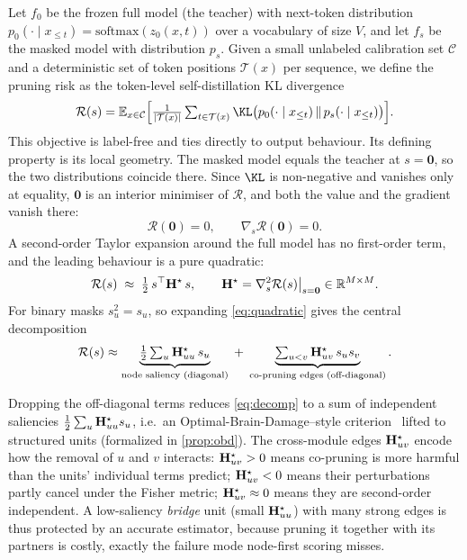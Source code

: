 Let $f_0$ be the frozen full model (the teacher) with next-token distribution
$p_0(\cdot\mid x_{\le t})=\mathrm{softmax}(z_0(x,t))$ over a vocabulary of size $V$, and let $f_s$ be
the masked model with distribution $p_s$. Given a small unlabeled calibration set
$\mathcal{C}$ and a deterministic set of token positions $\mathcal{T}(x)$ per sequence, we define the
pruning risk as the token-level self-distillation KL divergence
\begin{equation}
\mathcal{R}(s)=\mathbb{E}_{x\in\mathcal{C}}\Big[\tfrac{1}{|\mathcal{T}(x)|}
\textstyle\sum_{t\in\mathcal{T}(x)}\KL\big(p_0(\cdot\mid x_{\le t})\,\|\,p_s(\cdot\mid x_{\le t})\big)\Big].
\label{eq:risk}
\end{equation}
This objective is label-free and ties directly to output behaviour. Its defining property is its local
geometry. The masked model equals the teacher at $s=\mathbf{0}$, so the two distributions coincide there. Since
$\KL$ is non-negative and vanishes only at equality, $\mathbf 0$ is an interior minimiser of
$\mathcal{R}$, and both the value and the gradient vanish there:
\begin{equation}
\mathcal{R}(\mathbf{0})=0,\qquad \nabla_s\mathcal{R}(\mathbf{0})=0.
\label{eq:vanish}
\end{equation}
A second-order Taylor expansion around the full model has no first-order term, and the leading
behaviour is a pure quadratic:
\begin{equation}
\mathcal{R}(s)\;\approx\;\tfrac{1}{2}\,s^\top \mathbf{H}^\star\, s,
\qquad
\mathbf{H}^\star=\nabla_s^2\mathcal{R}(s)\big|_{s=\mathbf{0}}\in\mathbb{R}^{M\times M}.
\label{eq:quadratic}
\end{equation}
For binary masks $s_u^2=s_u$, so expanding \cref{eq:quadratic} gives the central decomposition
\begin{equation}
\mathcal{R}(s)\approx
\underbrace{\tfrac12\textstyle\sum_{u}\mathbf{H}^\star_{uu}\,s_u}_{\text{node saliency (diagonal)}}
\;+\;
\underbrace{\textstyle\sum_{u<v}\mathbf{H}^\star_{uv}\,s_u s_v}_{\text{co-pruning edges (off-diagonal)}}.
\label{eq:decomp}
\end{equation}

\begin{remark}
Dropping the off-diagonal terms reduces \cref{eq:decomp} to a sum of independent saliencies
$\tfrac12\sum_u \mathbf{H}^\star_{uu}s_u$, i.e.\ an Optimal-Brain-Damage--style criterion~\citep{lecun1989obd}
lifted to structured units (formalized in \cref{prop:obd}). The cross-module edges $\mathbf{H}^\star_{uv}$ encode how the
removal of $u$ and $v$ interacts: $\mathbf{H}^\star_{uv}>0$ means co-pruning is more harmful than the
units' individual terms predict; $\mathbf{H}^\star_{uv}<0$ means their perturbations partly cancel under the
Fisher metric; $\mathbf{H}^\star_{uv}\approx 0$ means they are second-order independent. A low-saliency
\emph{bridge} unit (small $\mathbf{H}^\star_{uu}$) with many strong edges is thus protected by an accurate estimator, because pruning it
together with its partners is costly, exactly the failure mode node-first scoring misses.
\end{remark}

